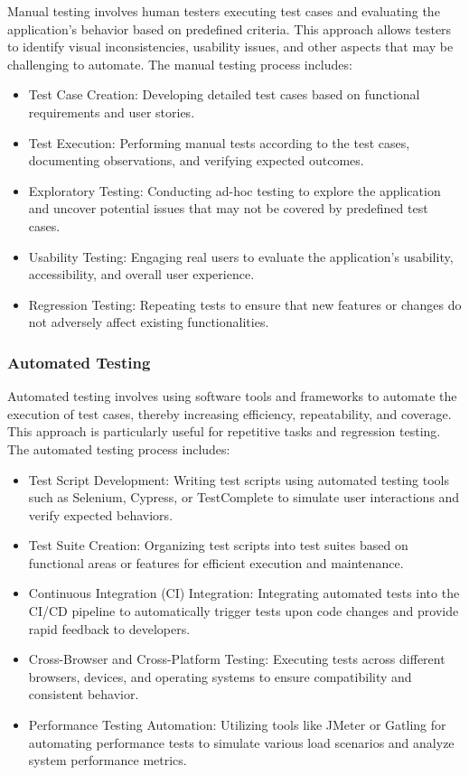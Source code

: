 		Manual testing involves human testers executing test cases and evaluating the application's behavior based on predefined criteria. This approach allows testers to identify visual inconsistencies, usability issues, and other aspects that may be challenging to automate. The manual testing process includes:
		
		\begin{itemize}
			\item Test Case Creation: Developing detailed test cases based on functional requirements and user stories.
			\item Test Execution: Performing manual tests according to the test cases, documenting observations, and verifying expected outcomes.
			\item Exploratory Testing: Conducting ad-hoc testing to explore the application and uncover potential issues that may not be covered by predefined test cases.
			\item Usability Testing: Engaging real users to evaluate the application's usability, accessibility, and overall user experience.
			\item Regression Testing: Repeating tests to ensure that new features or changes do not adversely affect existing functionalities.
		\end{itemize}
		
		\subsubsection{Automated Testing}
		
		Automated testing involves using software tools and frameworks to automate the execution of test cases, thereby increasing efficiency, repeatability, and coverage. This approach is particularly useful for repetitive tasks and regression testing. The automated testing process includes:
		
		\begin{itemize}
			\item Test Script Development: Writing test scripts using automated testing tools such as Selenium, Cypress, or TestComplete to simulate user interactions and verify expected behaviors.
			\item Test Suite Creation: Organizing test scripts into test suites based on functional areas or features for efficient execution and maintenance.
			\item Continuous Integration (CI) Integration: Integrating automated tests into the CI/CD pipeline to automatically trigger tests upon code changes and provide rapid feedback to developers.
			\item Cross-Browser and Cross-Platform Testing: Executing tests across different browsers, devices, and operating systems to ensure compatibility and consistent behavior.
			\item Performance Testing Automation: Utilizing tools like JMeter or Gatling for automating performance tests to simulate various load scenarios and analyze system performance metrics.
		\end{itemize}
		
